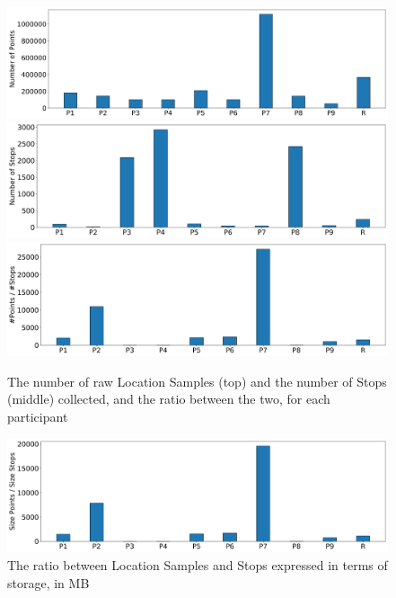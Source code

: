 \begin{figure}
    \centering
    \includegraphics[width=\textwidth]{images/study/storage/num_points.png}
    \includegraphics[width=\textwidth]{images/study/storage/num_stops.png}
    \includegraphics[width=\textwidth]{images/study/storage/compression_N.png}
    \caption{The number of raw Location Samples (top) and the number of Stops (middle) collected, and the ratio between the two, for each participant}
    \label{fig:plot-num-points-stops}
\end{figure}

\begin{figure}
    \centering
    \includegraphics[width=\textwidth]{images/study/storage/compression_mb.png}
    \caption{The ratio between Location Samples and Stops expressed in terms of storage, in MB}
    \label{fig:plot-num-points-stops}
\end{figure}

